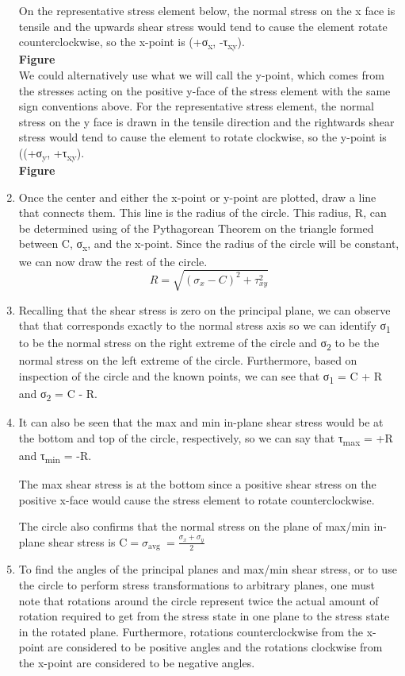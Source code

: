 \documentclass[
  letterpaper,
  DIV=11,
  numbers=noendperiod]{scrreprt}
\begin{document}
\begin{enumerate}
  On the representative stress element below, the normal stress on the x
  face is tensile and the upwards shear stress would tend to cause the
  element rotate counterclockwise, so the x-point is
  (+σ\textsubscript{x}, -τ\textsubscript{xy}).\\
  \textbf{Figure\\
  }We could alternatively use what we will call the y-point, which comes
  from the stresses acting on the positive y-face of the stress element
  with the same sign conventions above. For the representative stress
  element, the normal stress on the y face is drawn in the tensile
  direction and the rightwards shear stress would tend to cause the
  element to rotate clockwise, so the y-point is ((+σ\textsubscript{y},
  +τ\textsubscript{xy}).\\
  \textbf{Figure}
\item
  Once the center and either the x-point or y-point are plotted, draw a
  line that connects them. This line is the radius of the circle. This
  radius, R, can be determined using of the Pythagorean Theorem on the
  triangle formed between C, σ\textsubscript{x}, and the x-point. Since
  the radius of the circle will be constant, we can now draw the rest of
  the circle.\\
  \[
  R=\sqrt{\left(\sigma_x-C\right)^2+\tau_{x y}^2}
  \]
\item
  Recalling that the shear stress is zero on the principal plane, we can
  observe that that corresponds exactly to the normal stress axis so we
  can identify σ\textsubscript{1} to be the normal stress on the right
  extreme of the circle and σ\textsubscript{2} to be the normal stress
  on the left extreme of the circle. Furthermore, based on inspection of
  the circle and the known points, we can see that σ\textsubscript{1} =
  C + R and σ\textsubscript{2} = C - R.
\item
  It can also be seen that the max and min in-plane shear stress would
  be at the bottom and top of the circle, respectively, so we can say
  that τ\textsubscript{max} = +R and τ\textsubscript{min} = -R.

  The max shear stress is at the bottom since a positive shear stress on
  the positive x-face would cause the stress element to rotate
  counterclockwise.

  The circle also confirms that the normal stress on the plane of
  max/min in-plane shear stress is
  \(\mathrm{C}=\sigma_{\text {avg }}=\frac{\sigma_x+\sigma_y}{2}\)
\item
  To find the angles of the principal planes and max/min shear stress,
  or to use the circle to perform stress transformations to arbitrary
  planes, one must note that rotations around the circle represent twice
  the actual amount of rotation required to get from the stress state in
  one plane to the stress state in the rotated plane. Furthermore,
  rotations counterclockwise from the x-point are considered to be
  positive angles and the rotations clockwise from the x-point are
  considered to be negative angles.


\end{enumerate}
\end{document}
